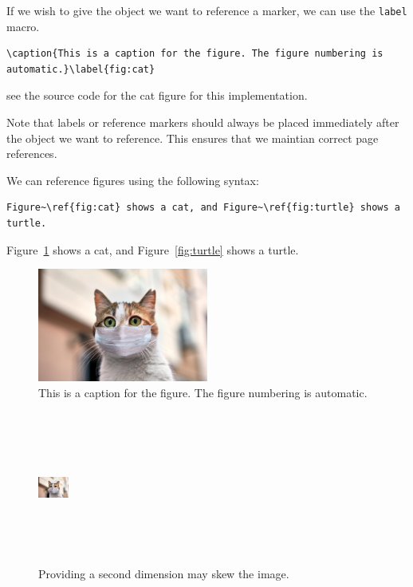 \documentclass[11pt, twoside]{article}
\begin{document}
If we wish to give the object we want to reference a marker, we can use the \lstinline{label} macro.
\begin{lstlisting}
\caption{This is a caption for the figure. The figure numbering is automatic.}\label{fig:cat}
\end{lstlisting}
see the source code for the cat figure for this implementation.

Note that labels or reference markers should always be placed immediately after the object we want to reference.
This ensures that we maintian correct page references.

We can reference figures using the following syntax:
\begin{lstlisting}
Figure~\ref{fig:cat} shows a cat, and Figure~\ref{fig:turtle} shows a turtle.
\end{lstlisting}
Figure~\ref{fig:cat} shows a cat, and Figure~\ref{fig:turtle} shows a turtle.
\begin{figure}[H]
    \centering
    \includegraphics[width=0.5\textwidth]{figures/cat.jpg}
    \caption{This is a caption for the figure. The figure numbering is automatic.}\label{fig:cat}
\end{figure}
\begin{figure}[H]
    \centering
    \includegraphics[width=1cm,height=5cm]{figures/cat.jpg}
    \caption{Providing a second dimension may skew the image.}
\end{figure}
\end{document}
